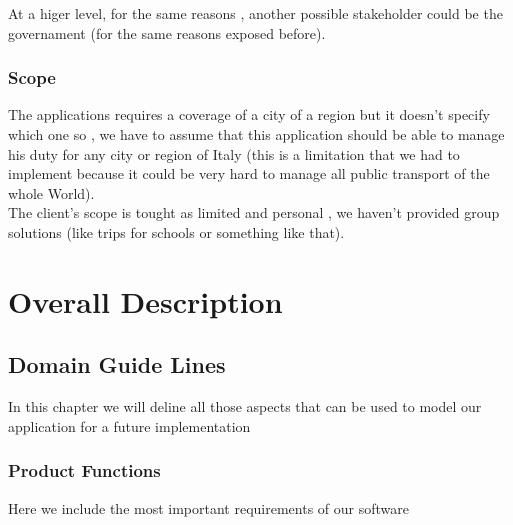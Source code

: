 \documentclass[a4paper,leqno]{book}
\begin{document}
At a higer level, for the same reasons , another possible stakeholder could be the governament (for the same reasons exposed before).

\section{Scope}

The applications requires a coverage of a city of a region but it doesn't specify which one so , we have to assume that this application should be able to manage his duty for any city or region of Italy (this is a limitation that we had to implement because it could be very hard to manage all public transport of the whole World).\\

The client's scope is tought as limited and personal , we haven't provided group solutions (like trips for schools or something like that).

\part{Overall Description}

\chapter{Domain Guide Lines}
In this chapter we will deline all those aspects that can be used to model our application for a future implementation

\section{Product Functions}
Here we include the most important requirements of our software
\end{document}
